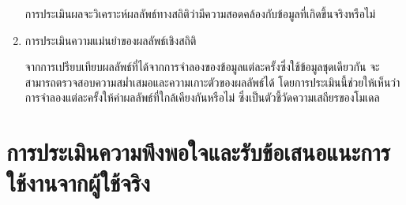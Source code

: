\begin{enumerate}
\begin{mypara}
                \indent การประเมินผลจะวิเคราะห์ผลลัพธ์ทางสถิติว่ามีความสอดคล้องกับข้อมูลที่เกิดขึ้นจริงหรือไม่
            \end{mypara}
        \item การประเมินความแม่นยำของผลลัพธ์เชิงสถิติ
            \begin{mypara}
                \indent จากการเปรียบเทียบผลลัพธ์ที่ได้จากการจำลองของข้อมูลแต่ละครั้งซึ่งใช้ข้อมูลชุดเดียวกัน 
                จะสามารถตรวจสอบความสม่ำเสมอและความเกาะตัวของผลลัพธ์ได้ โดยการประเมินนี้ช่วยให้เห็นว่า 
                การจำลองแต่ละครั้งให้ค่าผลลัพธ์ที่ใกล้เคียงกันหรือไม่ ซึ่งเป็นตัวชี้วัดความเสถียรของโมเดล 
            \end{mypara}
    \end{enumerate}

\section{การประเมินความพึงพอใจและรับข้อเสนอแนะการใช้งานจากผู้ใช้จริง}

